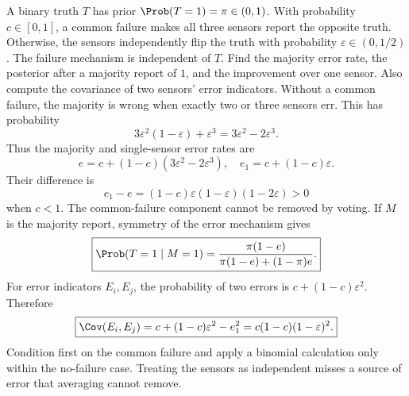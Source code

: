 A binary truth $T$ has prior $\Prob(T=1)=\pi\in(0,1)$. With probability $c\in[0,1]$, a common failure makes all three sensors report the opposite truth. Otherwise, the sensors independently flip the truth with probability $\varepsilon\in(0,1/2)$. The failure mechanism is independent of $T$. Find the majority error rate, the posterior after a majority report of $1$, and the improvement over one sensor. Also compute the covariance of two sensors' error indicators.
\solution Without a common failure, the majority is wrong when exactly two or three sensors err. This has probability
\[
3\varepsilon^2(1-\varepsilon)+\varepsilon^3
=3\varepsilon^2-2\varepsilon^3.
\]
Thus the majority and single-sensor error rates are
\[
e=c+(1-c)(3\varepsilon^2-2\varepsilon^3),\quad
e_1=c+(1-c)\varepsilon.
\]
Their difference is
\[
e_1-e=(1-c)\varepsilon(1-\varepsilon)(1-2\varepsilon)>0
\]
when $c<1$. The common-failure component cannot be removed by voting. If $M$ is the majority report, symmetry of the error mechanism gives
\[
\boxed{\Prob(T=1\mid M=1)=
\frac{\pi(1-e)}{\pi(1-e)+(1-\pi)e}.}
\]
For error indicators $E_i,E_j$, the probability of two errors is $c+(1-c)\varepsilon^2$. Therefore
\[
\boxed{\Cov(E_i,E_j)=c+(1-c)\varepsilon^2-e_1^2
=c(1-c)(1-\varepsilon)^2.}
\]
\insight Condition first on the common failure and apply a binomial calculation only within the no-failure case. Treating the sensors as independent misses a source of error that averaging cannot remove.
